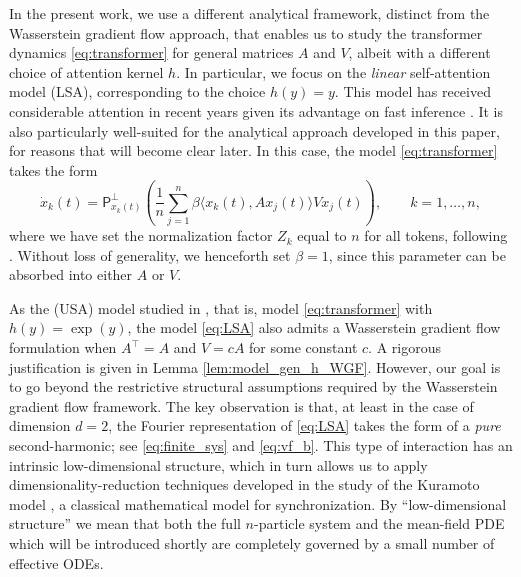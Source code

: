 \documentclass[10pt]{article}
\theoremstyle{definition}
\theoremstyle{definition}
\numberwithin{equation}{section}
\renewcommand{\P}{\mathsf{P}}
\begin{document}
In the present work, we use a different analytical framework, distinct from the Wasserstein gradient flow approach, that enables us to study the transformer dynamics \eqref{eq:transformer} for general matrices $A$ and $V$, albeit with a different choice of attention kernel $h$. 
In particular, we focus on the \textit{linear} self-attention model (LSA), corresponding to the choice $h(y)=y$. 
This model has received considerable attention in recent years given its advantage on fast inference \cite{katharopoulos2020transformers,peng2021random,choromanski2021rethinking,schlag2021linear,shen2021efficient}.
It is also particularly well-suited for the analytical approach developed in this paper, for reasons that will become clear later. 
In this case, the model \eqref{eq:transformer} takes the form 
\begin{equation}\label{eq:LSA} \tag{LSA}
    \Dot{x}_k(t) = \P^{\perp}_{x_k(t)} \left( \frac{1}{n} \sum_{j=1}^n \beta \langle x_k(t), A x_j(t) \rangle V x_j(t) \right), \qquad k=1, \dots, n,
\end{equation}
where we have set the normalization factor $Z_k$ equal to $n$ for all tokens, following \cite[Equation~(USA)]{geshkovski2023mathematical}. 
Without loss of generality, we henceforth set $\beta = 1$, since this parameter can be absorbed into either $A$ or $V$.

As the (USA) model studied in \cite{geshkovski2023mathematical, burger2025analysis}, that is, model \eqref{eq:transformer} with $h(y) = \exp(y)$, the model \eqref{eq:LSA}  also admits a Wasserstein gradient flow formulation when $A^{\top} = A$ and $V = cA$ for some constant $c$. 
A rigorous justification is given in Lemma \ref{lem:model_gen_h_WGF}. However, our goal is to go beyond the restrictive structural assumptions required by the Wasserstein gradient flow framework.
The key observation is that, at least in the case of dimension $d=2$, the Fourier representation of \eqref{eq:LSA} takes the form of a \textit{pure} second-harmonic; see \eqref{eq:finite_sys} and \eqref{eq:vf_b}. 
This type of interaction has an intrinsic low-dimensional structure, which in turn allows us to apply dimensionality-reduction techniques developed in the study of the Kuramoto model \cite{skardal2011cluster,ott2008low}, a classical mathematical model for synchronization. By ``low-dimensional structure” we mean that both the full $n$-particle system and the mean-field PDE which will be introduced shortly are completely governed by a small number of effective ODEs.
\end{document}
